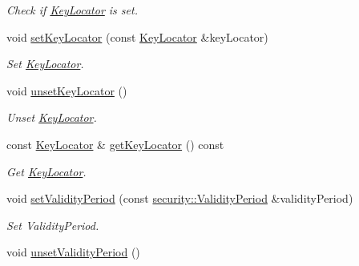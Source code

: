 \begin{DoxyCompactItemize}
\begin{DoxyCompactList}\small\item\em Check if \hyperlink{classndn_1_1KeyLocator}{Key\+Locator} is set. \end{DoxyCompactList}\item 
void \hyperlink{classndn_1_1SignatureInfo_a10de4d56707c937b23daf1e9e943d755}{set\+Key\+Locator} (const \hyperlink{classndn_1_1KeyLocator}{Key\+Locator} \&key\+Locator)\hypertarget{classndn_1_1SignatureInfo_a10de4d56707c937b23daf1e9e943d755}{}\label{classndn_1_1SignatureInfo_a10de4d56707c937b23daf1e9e943d755}

\begin{DoxyCompactList}\small\item\em Set \hyperlink{classndn_1_1KeyLocator}{Key\+Locator}. \end{DoxyCompactList}\item 
void \hyperlink{classndn_1_1SignatureInfo_aaaf98dba8d515291b9bbfe6b938ded08}{unset\+Key\+Locator} ()\hypertarget{classndn_1_1SignatureInfo_aaaf98dba8d515291b9bbfe6b938ded08}{}\label{classndn_1_1SignatureInfo_aaaf98dba8d515291b9bbfe6b938ded08}

\begin{DoxyCompactList}\small\item\em Unset \hyperlink{classndn_1_1KeyLocator}{Key\+Locator}. \end{DoxyCompactList}\item 
const \hyperlink{classndn_1_1KeyLocator}{Key\+Locator} \& \hyperlink{classndn_1_1SignatureInfo_adec6022755b51189bf6e173fde4654e4}{get\+Key\+Locator} () const
\begin{DoxyCompactList}\small\item\em Get \hyperlink{classndn_1_1KeyLocator}{Key\+Locator}. \end{DoxyCompactList}\item 
void \hyperlink{classndn_1_1SignatureInfo_a5c4f856a80654a3b37f9dc95a1686930}{set\+Validity\+Period} (const \hyperlink{classndn_1_1security_1_1ValidityPeriod}{security\+::\+Validity\+Period} \&validity\+Period)\hypertarget{classndn_1_1SignatureInfo_a5c4f856a80654a3b37f9dc95a1686930}{}\label{classndn_1_1SignatureInfo_a5c4f856a80654a3b37f9dc95a1686930}

\begin{DoxyCompactList}\small\item\em Set Validity\+Period. \end{DoxyCompactList}\item 
void \hyperlink{classndn_1_1SignatureInfo_aa233a846dc214eb04f93a95c78da223c}{unset\+Validity\+Period} ()\hypertarget{classndn_1_1SignatureInfo_aa233a846dc214eb04f93a95c78da223c}{}\label{classndn_1_1SignatureInfo_aa233a846dc214eb04f93a95c78da223c}


\end{DoxyCompactItemize}

